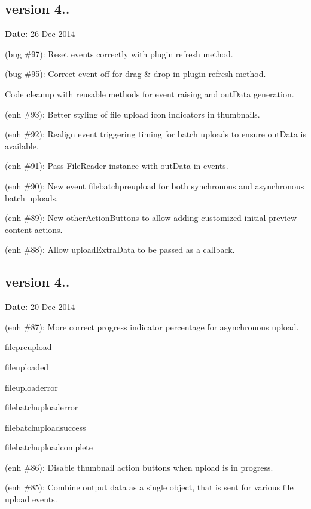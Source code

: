 \subsection*{version 4..}

{\bfseries Date\+:} 26-\/\+Dec-\/2014


\begin{DoxyItemize}
\item (bug \#97)\+: Reset events correctly with plugin refresh method.
\item (bug \#95)\+: Correct event off for drag \& drop in plugin refresh method.
\item Code cleanup with reusable methods for event raising and out\+Data generation.
\item (enh \#93)\+: Better styling of file upload icon indicators in thumbnails.
\item (enh \#92)\+: Realign event triggering timing for batch uploads to ensure out\+Data is available.
\item (enh \#91)\+: Pass File\+Reader instance with out\+Data in events.
\item (enh \#90)\+: New event {\ttfamily filebatchpreupload} for both synchronous and asynchronous batch uploads.
\item (enh \#89)\+: New {\ttfamily other\+Action\+Buttons} to allow adding customized initial preview content actions.
\item (enh \#88)\+: Allow upload\+Extra\+Data to be passed as a callback.
\end{DoxyItemize}

\subsection*{version 4..}

{\bfseries Date\+:} 20-\/\+Dec-\/2014


\begin{DoxyItemize}
\item (enh \#87)\+: More correct progress indicator percentage for asynchronous upload.
\begin{DoxyItemize}
\item {\ttfamily filepreupload}
\item {\ttfamily fileuploaded}
\item {\ttfamily fileuploaderror}
\item {\ttfamily filebatchuploaderror}
\item {\ttfamily filebatchuploadsuccess}
\item {\ttfamily filebatchuploadcomplete}
\end{DoxyItemize}
\item (enh \#86)\+: Disable thumbnail action buttons when upload is in progress.
\item (enh \#85)\+: Combine output data as a single object, that is sent for various file upload events.
\end{DoxyItemize}

